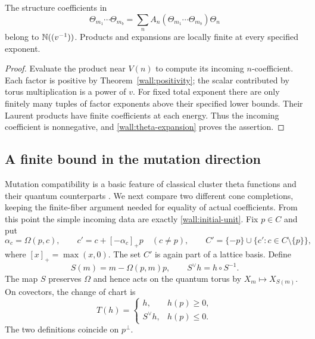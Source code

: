 \begin{corollary}
\label{wall:product}
The structure coefficients in
\[
 \Theta_{m_1}\cdots\Theta_{m_b}
 =\sum_n A_n(\Theta_{m_1}\cdots\Theta_{m_b})\Theta_n
\]
belong to $\mathbb N((v^{-1}))$.  Products and expansions are locally
finite at every specified exponent.
\end{corollary}

\begin{proof}
Evaluate the product near $V(n)$ to compute its incoming
$n$-coefficient.  Each factor is positive by
Theorem~\ref{wall:positivity}; the scalar contributed by torus
multiplication is a power of $v$.  For fixed total exponent there
are only finitely many tuples of factor exponents above their
specified lower bounds.  Their Laurent products have finite
coefficients at each energy.  Thus the incoming coefficient is
nonnegative, and \eqref{wall:theta-expansion} proves the assertion.
\end{proof}

\subsection{A finite bound in the mutation direction}

Mutation compatibility is a basic feature of classical cluster theta
functions \cite[Theorem~1.24 and Proposition~3.6]{GHKK18} and their
quantum counterparts \cite[Appendix~A]{DM21}.  We next compare two
different cone completions, keeping the finite-fiber argument needed
for equality of actual coefficients.  From this point
the simple incoming data are exactly
\eqref{wall:initial-unit}.  Fix $p\in C$ and put
\begin{equation}
 \alpha_c=\Omega(p,c),\qquad
 c'=c+[-\alpha_c]_+p\quad(c\ne p),\qquad
 C'=\{-p\}\cup\{c':c\in C\setminus\{p\}\},
 \label{wall:mutated-roots}
\end{equation}
where $[x]_+=\max(x,0)$.  The set $C'$ is again part of a
lattice basis.  Define
\begin{equation}
 S(m)=m-\Omega(p,m)p,
 \qquad S^\vee h=h\circ S^{-1}.
 \label{wall:linear-mutation}
\end{equation}
The map $S$ preserves $\Omega$ and hence acts on the quantum torus
by $X_m\mapsto X_{S(m)}$.  On covectors, the change of chart is
\begin{equation}
 T(h)=\begin{cases}
 h,&h(p)\ge0,\\
 S^\vee h,&h(p)\le0.
 \end{cases}
 \label{wall:piecewise-mutation}
\end{equation}
The two definitions coincide on $p^\perp$.

